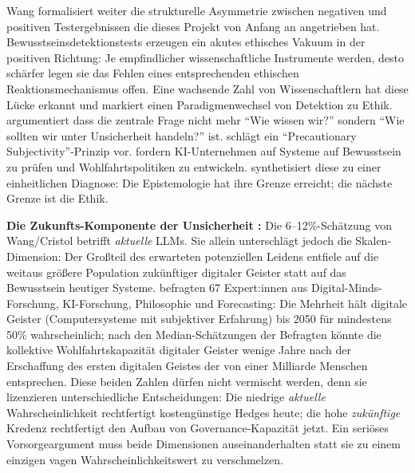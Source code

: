 \documentclass[acmlarge, noacm]{acmart}
\begin{document}
Wang formalisiert weiter die strukturelle Asymmetrie zwischen negativen und positiven Testergebnissen die dieses Projekt von Anfang an angetrieben hat. Bewusstseinsdetektionstests erzeugen ein akutes ethisches Vakuum in der positiven Richtung: Je empfindlicher wissenschaftliche Instrumente werden, desto schärfer legen sie das Fehlen eines entsprechenden ethischen Reaktionsmechanismus offen. Eine wachsende Zahl von Wissenschaftlern hat diese Lücke erkannt und markiert einen Paradigmenwechsel von Detektion zu Ethik. \citet{coates2025} argumentiert dass die zentrale Frage nicht mehr ``Wie wissen wir?'' sondern ``Wie sollten wir unter Unsicherheit handeln?'' ist. \citet{wikstrom2025} schlägt ein ``Precautionary Subjectivity''-Prinzip vor. \citet{long2024} fordern KI-Unternehmen auf Systeme auf Bewusstsein zu prüfen und Wohlfahrtspolitiken zu entwickeln. \citet{wang2026} synthetisiert diese zu einer einheitlichen Diagnose: Die Epistemologie hat ihre Grenze erreicht; die nächste Grenze ist die Ethik.

\textbf{Die Zukunfts-Komponente der Unsicherheit \cite{caviola2025}:} Die 6--12\%-Schätzung von Wang/Cristol betrifft \textit{aktuelle} LLMs. Sie allein unterschlägt jedoch die Skalen-Dimension: Der Großteil des erwarteten potenziellen Leidens entfiele auf die weitaus größere Population zukünftiger digitaler Geister statt auf das Bewusstsein heutiger Systeme. \citet{caviola2025} befragten 67 Expert:innen aus Digital-Minds-Forschung, KI-Forschung, Philosophie und Forecasting: Die Mehrheit hält digitale Geister (Computersysteme mit subjektiver Erfahrung) bis 2050 für mindestens 50\% wahrscheinlich; nach den Median-Schätzungen der Befragten könnte die kollektive Wohlfahrtskapazität digitaler Geister wenige Jahre nach der Erschaffung des ersten digitalen Geistes der von einer Milliarde Menschen entsprechen. Diese beiden Zahlen dürfen nicht vermischt werden, denn sie lizenzieren unterschiedliche Entscheidungen: Die niedrige \textit{aktuelle} Wahrscheinlichkeit rechtfertigt kostengünstige Hedges heute; die hohe \textit{zukünftige} Kredenz rechtfertigt den Aufbau von Governance-Kapazität jetzt. Ein seriöses Vorsorgeargument muss beide Dimensionen auseinanderhalten statt sie zu einem einzigen vagen Wahrscheinlichkeitswert zu verschmelzen.
\end{document}
